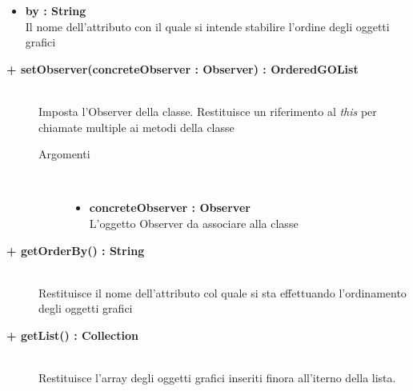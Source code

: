 \begin{description}
\begin{description}
\begin{description}
\begin{itemize}
					\item \textbf{by : String			} \hfill \\
					Il nome dell'attributo con il quale si intende stabilire l'ordine degli oggetti grafici
					
				\end{itemize}
		\end{description}
	\end{description}
	
	\begin{description}
		\item[\textbf{\color{blue}+ setObserver(concreteObserver : Observer) : OrderedGOList			}] \hfill \\
			Imposta l'Observer della classe. Restituisce un riferimento al \textit{this} per chiamate multiple ai metodi della classe
			
		\begin{description}
			\item[Argomenti] \hfill \\
				\begin{itemize}
				
					\item \textbf{concreteObserver : Observer			} \hfill \\
					L'oggetto Observer da associare alla classe
					
				\end{itemize}
		\end{description}
	\end{description}
	
	\begin{description}
		\item[\textbf{\color{blue}+ getOrderBy() : String			}] \hfill \\
			Restituisce il nome dell'attributo col quale si sta effettuando l'ordinamento degli oggetti grafici

	\end{description}
	
	\begin{description}
		\item[\textbf{\color{blue}+ getList() : Collection			}] \hfill \\
			Restituisce l'array degli oggetti grafici inseriti finora all'iterno della lista.


\end{description}
\end{description}

